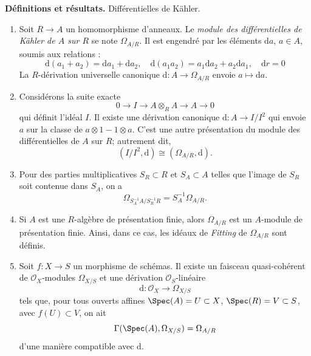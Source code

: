 \noindent
{\bf Définitions et résultats.} Différentielles de K\"ahler.
\begin{enumerate}
\item Soit $R \to A$ un homomorphisme d'anneaux. Le {\it module des différentielles de K\"ahler
de $A$ sur $R$} se note $\Omega_{A/R}$.
Il est engendré par les éléments $\text{d}a$, $a \in A$,
soumis aux relations :
$$
\text{d}(a_1 + a_2) = \text{d}a_1 + \text{d}a_2,\quad
\text{d}(a_1a_2) = a_1\text{d}a_2 + a_2\text{d}a_1,\quad
\text{d}r = 0
$$
La $R$-dérivation universelle canonique $\text{d} : A \to \Omega_{A/R}$
envoie $a\mapsto \text{d}a$.
\item Considérons la suite exacte
$$
0 \to I \to A \otimes_R A \to A \to 0
$$
qui définit l'idéal $I$. Il existe une dérivation canonique
$\text{d} : A \to I/I^2$ qui envoie $a$ sur la classe de
$a \otimes 1 - 1 \otimes a$. C'est une autre présentation du
module des différentielles de $A$ sur $R$; autrement dit,
$$
(I/I^2, \text{d}) \cong (\Omega_{A/R}, \text{d}).
$$
\item Pour des parties multiplicatives $S_R \subset R$ et
$S_A \subset A$ telles que l'image de $S_R$ soit contenue dans $S_A$, on a
$$
\Omega_{S_A^{-1}A / S_R^{-1}R} =
S_A^{-1}\Omega_{A/R}.
$$
\item Si $A$ est une $R$-algèbre de présentation finie, alors
$\Omega_{A/R}$ est un $A$-module de présentation finie. Ainsi, dans
ce cas, les idéaux de {\it Fitting} de $\Omega_{A/R}$ sont définis.
\item Soit $f : X \to S$ un morphisme de schémas. Il existe
un faisceau quasi-cohérent de ${\mathcal O}_X$-modules $\Omega_{X/S}$
et une dérivation ${\mathcal O}_S$-linéaire
$$
\text{d} : {\mathcal O}_X \longrightarrow \Omega_{X/S}
$$
tels que, pour tous ouverts affines $\Spec(A) = U \subset X$,
$\Spec(R) = V \subset S$,
avec $f(U) \subset V$, on ait
$$
\Gamma(\Spec(A), \Omega_{X/S}) = \Omega_{A/R}
$$
d'une manière compatible avec $\text{d}$.
\end{enumerate}

